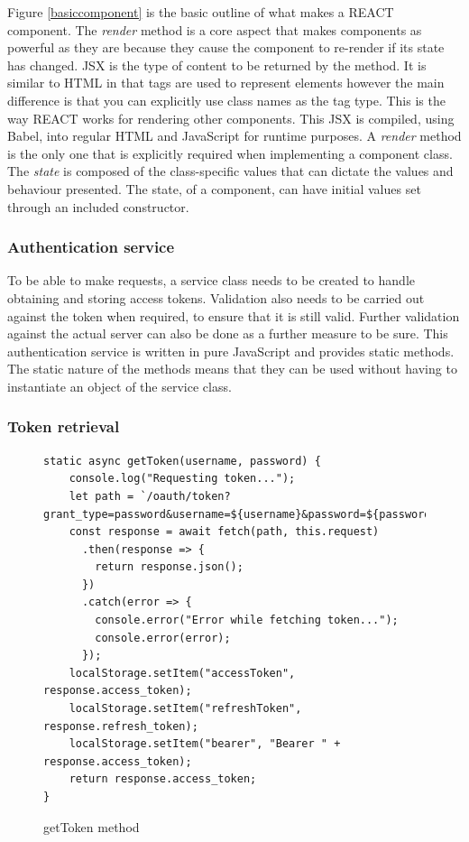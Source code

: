 Figure \ref{basiccomponent} is the basic outline of what makes a REACT component.
The \emph{render} method is a core aspect that makes components as powerful as they are because they cause the component to re-render 
if its state has changed.
JSX is the type of content to be returned by the method.
It is similar to HTML in that tags are used to represent elements however the main difference is that you can explicitly use class
names as the tag type. This is the way REACT works for rendering other components.
This JSX is compiled, using Babel, into regular HTML and JavaScript for runtime purposes.
A \emph{render} method is the only one that is explicitly required when implementing a component class.
The \emph{state} is composed of the class-specific values that can dictate the values and behaviour presented.
The state, of a component, can have initial values set through an included constructor.


\subsubsection{Authentication service}
To be able to make requests, a service class needs to be created to handle obtaining and storing access tokens.
Validation also needs to be carried out against the token when required,  to ensure that it is still valid.
Further validation against the actual server can also be done as a further measure to be sure.
This authentication service is written in pure JavaScript and provides static methods.
The static nature of the methods means that they can be used without having to instantiate an object of the service class.

\subsubsection*{Token retrieval}

\begin{figure}[ht]
    \centering
    \begin{lstlisting}
static async getToken(username, password) {
    console.log("Requesting token...");
    let path = `/oauth/token?grant_type=password&username=${username}&password=${password}`;
    const response = await fetch(path, this.request)
      .then(response => {
        return response.json();
      })
      .catch(error => {
        console.error("Error while fetching token...");
        console.error(error);
      });
    localStorage.setItem("accessToken", response.access_token);
    localStorage.setItem("refreshToken", response.refresh_token);
    localStorage.setItem("bearer", "Bearer " + response.access_token);
    return response.access_token;
}
    \end{lstlisting}
    \caption{getToken method}
    \label{gettokenmethod}
\end{figure}

